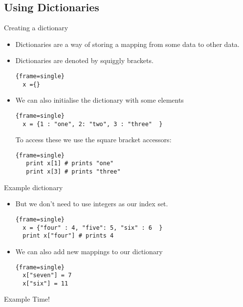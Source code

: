 \documentclass{beamer}
\begin{document}
\subsection{Using Dictionaries}
\begin{frame}[fragile]{Creating a dictionary}
  \begin{itemize}
\item{
Dictionaries are a way of storing a mapping from some data to other data. 
}
  \item {
  Dictionaries are denoted by squiggly brackets. 
  \begin{block}{}
  \begin{lstlisting}{frame=single}
  x ={} 
  \end{lstlisting}
\end{block}
 } 
 \pause
 \item {
We can also initialise the dictionary with some elements	  
 \begin{block}{}
 \begin{lstlisting}{frame=single}
  x = {1 : "one", 2: "two", 3 : "three"  }
  \end{lstlisting}
\end{block}
\pause

  To access these we use the square bracket accessors:
  \begin{block}{}
  \begin{lstlisting}{frame=single}
   print x[1] # prints "one" 
   print x[3] # prints "three" 
  \end{lstlisting}
\end{block}
  }
  \end{itemize}
  

\end{frame}
\begin{frame}[fragile]{Example dictionary}
\begin{itemize}
 \item {But we don't need to use integers as our index set.
 \begin{block}{}
 \begin{lstlisting}{frame=single}
  x = {"four" : 4, "five": 5, "six" : 6  }
  print x["four"] # prints 4
  \end{lstlisting}
\end{block}
}
\pause
\item {We can also add new mappings to our dictionary
 \begin{block}{}
 \begin{lstlisting}{frame=single}
  x["seven"] = 7
  x["six"] = 11
  \end{lstlisting}
\end{block}
}
 \end{itemize}
  

\end{frame}
\begin{frame}
	Example Time!
\end{frame}
\end{document}

